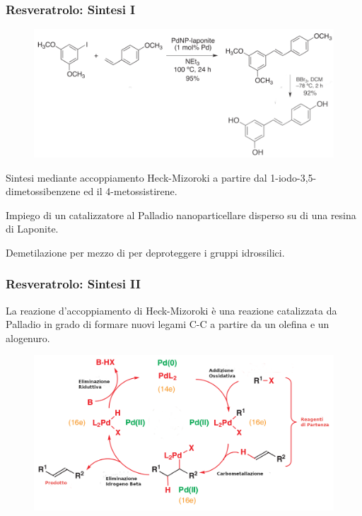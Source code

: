 \documentclass[9pt]{beamer}
\begin{document}
\begin{frame}
	\frametitle{Resveratrolo: Sintesi I}
	\begin{figure}
		\includegraphics{immagini/totale_resveratrolo.png}
	\end{figure}
	Sintesi mediante accoppiamento Heck-Mizoroki a partire dal 1-iodo-3,5-dimetossibenzene ed il 4-metossistirene.
	
	Impiego di un catalizzatore al Palladio nanoparticellare disperso su di una resina di Laponite.
	
	Demetilazione per mezzo di  per deproteggere i gruppi idrossilici.
	
\end{frame}

\begin{frame}
	\frametitle{Resveratrolo: Sintesi II}
	\bigskip
	La reazione d'accoppiamento di Heck-Mizoroki è una reazione catalizzata da Palladio in grado di formare nuovi legami C-C a partire da un olefina e un alogenuro.
	
	\begin{figure}
		\centering
		\includegraphics[width=\textwidth]{immagini/heck.png}
	\end{figure}
\end{frame}
\end{document}
